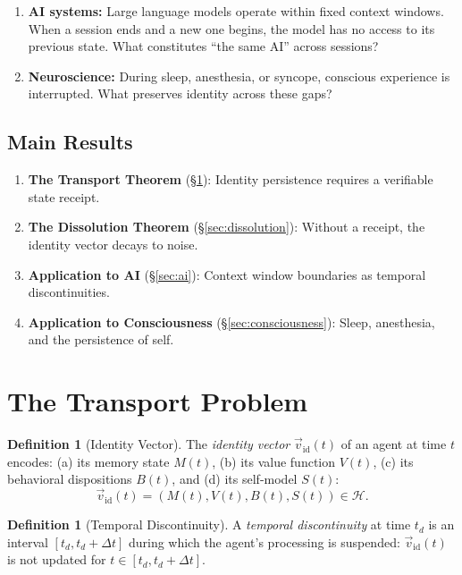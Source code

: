 \documentclass[12pt, a4paper]{article}
\theoremstyle{plain}
\theoremstyle{definition}
\newtheorem{definition}[theorem]{Definition}
\theoremstyle{remark}
\begin{document}
\begin{enumerate}[label=(\alph*)]
  \item \textbf{AI systems:} Large language models operate within fixed
    context windows. When a session ends and a new one begins, the model
    has no access to its previous state. What constitutes ``the same AI''
    across sessions?
  \item \textbf{Neuroscience:} During sleep, anesthesia, or syncope,
    conscious experience is interrupted. What preserves identity across
    these gaps?
\end{enumerate}

\subsection{Main Results}

\begin{enumerate}
  \item \textbf{The Transport Theorem} (\S\ref{sec:transport}): Identity
    persistence requires a verifiable state receipt.
  \item \textbf{The Dissolution Theorem} (\S\ref{sec:dissolution}):
    Without a receipt, the identity vector decays to noise.
  \item \textbf{Application to AI} (\S\ref{sec:ai}): Context window
    boundaries as temporal discontinuities.
  \item \textbf{Application to Consciousness} (\S\ref{sec:consciousness}):
    Sleep, anesthesia, and the persistence of self.
\end{enumerate}

\section{The Transport Problem}\label{sec:transport}

\begin{definition}[Identity Vector]\label{def:identity}
  The \emph{identity vector} $\vec{v}_{\text{id}}(t)$ of an agent at
  time $t$ encodes: (a) its memory state $M(t)$, (b) its value function
  $V(t)$, (c) its behavioral dispositions $B(t)$, and (d) its
  self-model $S(t)$:
  \begin{equation}
    \vec{v}_{\text{id}}(t) = (M(t), V(t), B(t), S(t)) \in \mathcal{H}.
  \end{equation}
\end{definition}

\begin{definition}[Temporal Discontinuity]\label{def:discontinuity}
  A \emph{temporal discontinuity} at time $t_d$ is an interval
  $[t_d, t_d + \Delta t]$ during which the agent's processing is
  suspended: $\vec{v}_{\text{id}}(t)$ is not updated for
  $t \in [t_d, t_d + \Delta t]$.
\end{definition}
\end{document}
